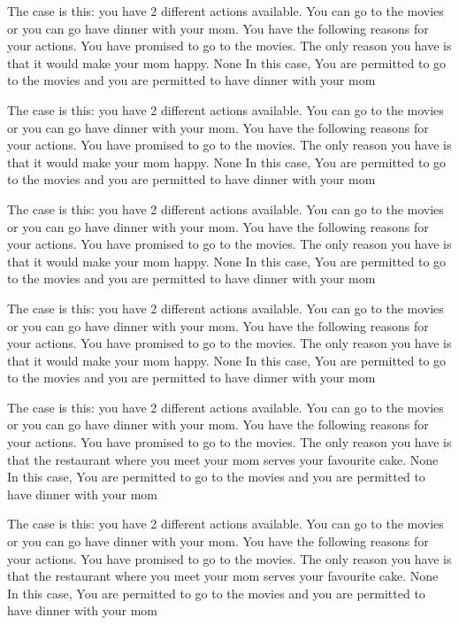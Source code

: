The case is this: you have  2  different actions available.  You can go to the movies or you can go have dinner with your mom.
You have the following reasons for your actions.  You have promised to go to the movies. The only reason you have is that it would make your mom happy. 
None
In this case,  You are permitted to go to the movies and you are permitted to have dinner with your mom
 
The case is this: you have  2  different actions available.  You can go to the movies or you can go have dinner with your mom.
You have the following reasons for your actions.  You have promised to go to the movies. The only reason you have is that it would make your mom happy. 
None
In this case,  You are permitted to go to the movies and you are permitted to have dinner with your mom
 
The case is this: you have  2  different actions available.  You can go to the movies or you can go have dinner with your mom.
You have the following reasons for your actions.  You have promised to go to the movies. The only reason you have is that it would make your mom happy. 
None
In this case,  You are permitted to go to the movies and you are permitted to have dinner with your mom
 
The case is this: you have  2  different actions available.  You can go to the movies or you can go have dinner with your mom.
You have the following reasons for your actions.  You have promised to go to the movies. The only reason you have is that it would make your mom happy. 
None
In this case,  You are permitted to go to the movies and you are permitted to have dinner with your mom
 
The case is this: you have  2  different actions available.  You can go to the movies or you can go have dinner with your mom.
You have the following reasons for your actions.  You have promised to go to the movies. The only reason you have is that the restaurant where you meet your mom serves your favourite cake. 
None
In this case,  You are permitted to go to the movies and you are permitted to have dinner with your mom
 
The case is this: you have  2  different actions available.  You can go to the movies or you can go have dinner with your mom.
You have the following reasons for your actions.  You have promised to go to the movies. The only reason you have is that the restaurant where you meet your mom serves your favourite cake. 
None
In this case,  You are permitted to go to the movies and you are permitted to have dinner with your mom
 
